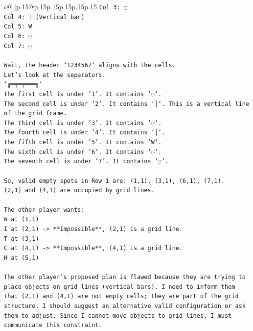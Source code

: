 \documentclass{article}
\begin{document}
{\begin{supertabular}{c@{$\;$}|p{.15\linewidth}@{}p{.15\linewidth}p{.15\linewidth}p{.15\linewidth}p{.15\linewidth}p{.15\linewidth}}
{{{\texttt{Col 3: ◌} \\
\texttt{Col 4: │ (Vertical bar)} \\
\texttt{Col 5: W} \\
\texttt{Col 6: ◌} \\
\texttt{Col 7: ◌} \\
\\ 
\texttt{Wait, the header `1234567` aligns with the cells.} \\
\texttt{Let's look at the separators.} \\
\texttt{`╔═╤═╤═══╗`} \\
\texttt{The first cell is under '1'. It contains `◌`.} \\
\texttt{The second cell is under '2'. It contains `│`. This is a vertical line of the grid frame.} \\
\texttt{The third cell is under '3'. It contains `◌`.} \\
\texttt{The fourth cell is under '4'. It contains `│`.} \\
\texttt{The fifth cell is under '5'. It contains `W`.} \\
\texttt{The sixth cell is under '6'. It contains `◌`.} \\
\texttt{The seventh cell is under '7'. It contains `◌`.} \\
\\ 
\texttt{So, valid empty spots in Row 1 are: (1,1), (3,1), (6,1), (7,1).} \\
\texttt{(2,1) and (4,1) are occupied by grid lines.} \\
\\ 
\texttt{The other player wants:} \\
\texttt{W at (1,1)} \\
\texttt{I at (2,1) {-}> **Impossible**, (2,1) is a grid line.} \\
\texttt{T at (3,1)} \\
\texttt{C at (4,1) {-}> **Impossible**, (4,1) is a grid line.} \\
\texttt{H at (5,1)} \\
\\ 
\texttt{The other player's proposed plan is flawed because they are trying to place objects on grid lines (vertical bars). I need to inform them that (2,1) and (4,1) are not empty cells; they are part of the grid structure. I should suggest an alternative valid configuration or ask them to adjust. Since I cannot move objects to grid lines, I must communicate this constraint.} \\
\\ 
}}}
\end{supertabular}}
\end{document}
